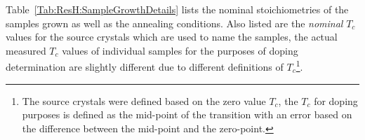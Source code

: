 Table~\ref{Tab:ResH:SampleGrowthDetails} lists the nominal stoichiometries of the samples grown as well as the annealing conditions. Also listed are the \emph{nominal} $T_c$ values for the source crystals which are used to name the samples, the actual measured $T_c$ values of individual samples for the purposes of doping determination are slightly different due to different definitions of $T_c$\footnote{The source crystals were defined based on the zero value $T_c$, the $T_c$ for doping purposes is defined as the mid-point of the transition with an error based on the difference between the mid-point and the zero-point.}.

